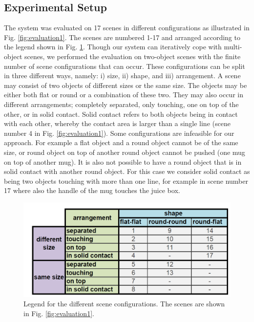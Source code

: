 \subsection{Experimental Setup}
The system was evaluated on 17 scenes in different configurations
as illustrated in Fig. \ref{fig:evaluation1}. The   scenes  are   
numbered  1-17 and arranged according to the legend shown in Fig. \ref{fig:table_scenes}.
Though our system can iteratively
cope with multi-object scenes, we performed the evaluation on two-object
scenes with the  finite number  of scene
configurations that  can occur. These configurations  can be split in  three different
ways, namely: i)  size, ii) shape, and iii)  arrangement.  A scene may
consist  of two  objects  of different  sizes  or the  same size.  The
objects may  be either both  flat or round  or a combination  of these
two.  They  may  also  occur  in  different  arrangements;  completely
separated, only  touching, one on  top of the other,  or in solid
contact. Solid  contact refers to  both objects being in  contact with
each  other,  whereby  the  contact  area  is  larger  than  a  single
line (scene   number  4 in Fig. \ref{fig:evaluation1}). Some configurations are
infeasible for our approach.  For example a flat  object and a
round  object cannot  be of the  same  size, or  round object  on top  of
another  round object  cannot be  pushed (one  mug on  top  of another
mug). It is also not possible to  have a round object that is in solid
contact with  another round  object. For this  case we  consider solid
contact as  being two objects touching  with more than  one line, for
example in scene number 17 where also  the handle of the mug  touches the juice box.  

\begin{figure}[ht!]
  \centering \includegraphics[width=0.8\columnwidth]{figures/table_scenes.png}
  \vspace{-2ex}
  \caption{Legend for the different scene configurations. The scenes are shown in Fig. \ref{fig:evaluation1}.
  }
  \label{fig:table_scenes}
\end{figure}

